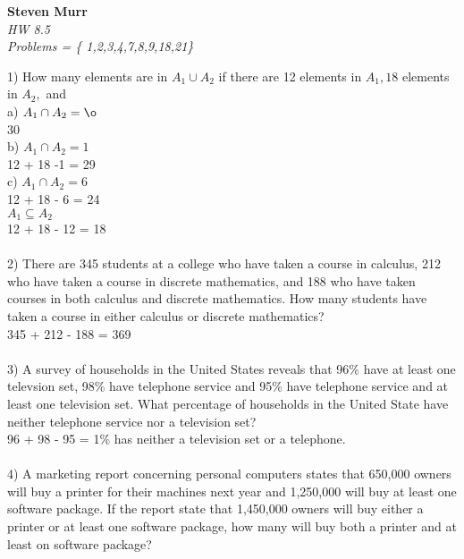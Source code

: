 \documentclass{article}
\begin{document}
\setcounter{totalnumber}{5}
   \begin{flushright}
      \Large\textbf{Steven Murr}\\
      \large\textit{HW 8.5} \\
      \large\textit{ Problems = \{ 1,2,3,4,7,8,9,18,21\} }
   \end{flushright}
\begin{flushleft}
\makeatletter%
\setlength{\@fptop}{5pt}
\makeatother
\setlength\parindent{0pt}1) How many elements are in $A_1 \cup A_2$ if there are 12 elements in $A_1, 18$ elements in $A_2,$ and \\
\setlength\parindent{24pt}a) $A_1 \cap A_2 = \o$ \\
\setlength\parindent{48pt} 30 \\
\setlength\parindent{24pt}b) $A_1 \cap A_2 = 1$ \\
\setlength\parindent{48pt} 12 + 18 -1 = 29 \\
\setlength\parindent{24pt}c) $A_1 \cap A_2 = 6$ \\
\setlength\parindent{48pt} 12 + 18 - 6 = 24 \\
\setlength\parindent{24pt}$A_1 \subseteq A_2$ \\
\setlength\parindent{48pt} 12 + 18 - 12 = 18 \\
~\\
\setlength\parindent{0pt}2) There are 345 students at a college who have taken a course in calculus, 212 who have taken a course in discrete mathematics, and 188 who have taken courses in both calculus and discrete mathematics.  How many students have taken a course in either calculus or discrete mathematics? \\
\setlength\parindent{24pt} 345 + 212 - 188 = 369 \\
~\\
\setlength\parindent{0pt}3) A survey of households in the United States reveals that 96\% have at least one televsion set, 98\% have telephone service and 95\% have telephone service and at least one television set.  What percentage of households in the United State have neither telephone service nor a television set? \\
\setlength\parindent{24pt}96 + 98 - 95 = 1\% has neither a television set or a telephone. \\
~\\
\setlength\parindent{0pt}4) A marketing report concerning personal computers states that 650,000 owners will buy a printer for their machines next year and 1,250,000 will buy at least one software package.  If the report state that 1,450,000 owners will buy either a printer or at least one software package, how many will buy both a printer and at least on software package? \\

\end{flushleft}
\end{document}
